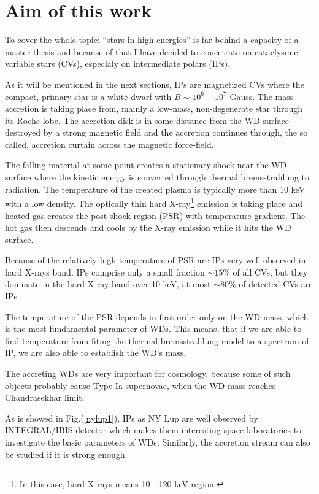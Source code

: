 \documentclass[oneside,a4paper,11pt]{report}
\begin{document}
\section{Aim of this work}
To cover the whole topic: ``stars in high energies'' is far behind a capacity of a master thesis and because of that I have decided 
to concetrate on cataclysmic variable stars (CVs), especialy on intermediate polars (IPs). 

As it will be mentioned in the next sections, IPs are magnetized CVs where the compact, primary star 
is a white dwarf with $B\sim 10^6 -10^7$ Gauss. The mass accretion is taking place from, mainly a low-mass, non-degenerate star through its Roche lobe.  
The accretion disk is in some distance from the WD surface destroyed by a strong magnetic field and 
the accretion continues through, the so called, accretion curtain across the magnetic force-field.

The falling material at some point creates a stationary shock near the WD surface where the kinetic energy is converted 
through thermal bremsstrahlung to radiation. The temperature of the created plasma is typically more than 
10 keV with a low density. The optically thin hard X-ray\footnote{In this case, hard X-rays means 10 - 120 keV region.} emission is taking place and heated gas creates the 
post-shock region (PSR) with temperature gradient. The hot gas then descends and cools by the X-ray 
emission while it hits the WD surface.      

Because of the relatively high temperature of PSR are IPs very well observed in hard X-rays band. 
IPs comprise only a small fraction $\sim 15\%$ of all CVs, but they dominate in the hard X-ray band over 10 keV, at most 
$\sim 80\%$ of detected CVs are IPs \citet{2009MNRAS.392..630L}. 

The temperature of the PSR depends in first order only on the WD mass, which is the most fundamental parameter of WDs.
This means, that if we are able to find temperature from fiting the thermal bremsstrahlung model to a spectrum of IP, 
we are also able to establish the WD's mass. 

The accreting WDs are very important for cosmology, because some of such objects probably cause Type Ia supernovae, 
when the WD mass reaches Chandrasekhar limit. 

As is showed in Fig.(\ref{nylup1}), IPs as NY Lup are well observed by INTEGRAL/IBIS detector which makes them 
interesting space laboratories to investigate the basic parameters of WDs. Similarly, the accretion stream can also be studied if it is strong enough.
    
\end{document}
